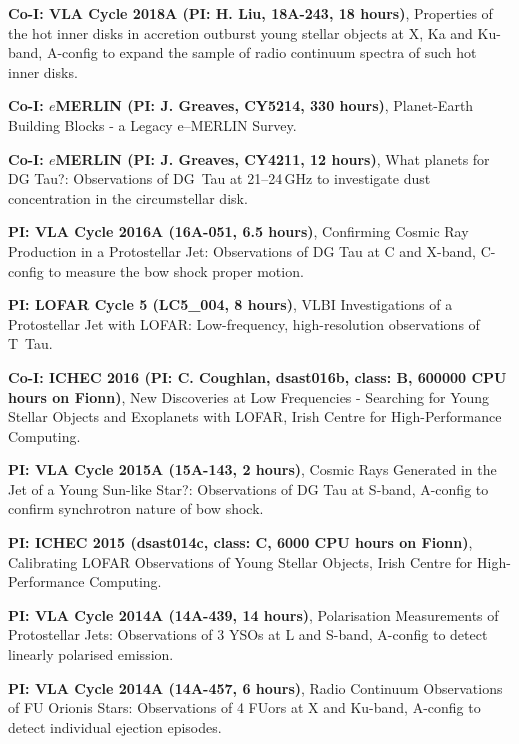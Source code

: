 
\begin{cvpubs}
  \cvpub
    {
      \begin{cvlist}
  \item {\textbf{Co-I: VLA Cycle 2018A (PI: H. Liu, 18A-243, 18 hours)}, Properties of the hot inner disks in accretion outburst young stellar objects at X, Ka and Ku-band, A-config to expand the sample of radio continuum spectra of such hot inner disks.}
  \item {\textbf{Co-I: $e$MERLIN (PI: J. Greaves, CY5214, 330 hours)}, Planet-Earth Building Blocks - a Legacy e--MERLIN Survey.}
  \item {\textbf{Co-I: $e$MERLIN (PI: J. Greaves, CY4211, 12 hours)}, What planets for DG Tau?: Observations of DG~Tau at 21--24\,GHz to investigate dust concentration in the circumstellar disk.}
  \item {\textbf{PI: VLA Cycle 2016A (16A-051, 6.5 hours)}, Confirming Cosmic Ray Production in a Protostellar Jet: Observations of DG Tau at C and X-band, C-config to measure the bow shock proper motion.}
  \item {\textbf{PI: LOFAR Cycle 5 (LC5\_004, 8 hours)}, VLBI Investigations of a Protostellar Jet with LOFAR: Low-frequency, high-resolution observations of T~Tau.}
    \item {\textbf{Co-I: ICHEC 2016 (PI: C. Coughlan, dsast016b, class: B, 600000 CPU hours on Fionn)}, New Discoveries at Low Frequencies - Searching for Young Stellar Objects and Exoplanets with LOFAR, Irish Centre for High-Performance Computing.}
  \item {\textbf{PI: VLA Cycle 2015A (15A-143, 2 hours)}, Cosmic Rays Generated in the Jet of a Young Sun-like Star?: Observations of DG Tau at S-band, A-config to confirm synchrotron nature of bow shock.}
  \item {\textbf{PI: ICHEC 2015 (dsast014c, class: C, 6000 CPU hours on Fionn)}, Calibrating LOFAR Observations of Young Stellar Objects, Irish Centre for High-Performance Computing.}
  \item {\textbf{PI: VLA Cycle 2014A (14A-439, 14 hours)}, Polarisation Measurements of Protostellar Jets: Observations of 3 YSOs at L and S-band, A-config to detect linearly polarised emission.}
  \item {\textbf{PI: VLA Cycle 2014A (14A-457, 6 hours)}, Radio Continuum Observations of FU Orionis Stars: Observations of 4 FUors at X and Ku-band, A-config to detect individual ejection episodes.}

\end{cvlist}}
\end{cvpubs}
